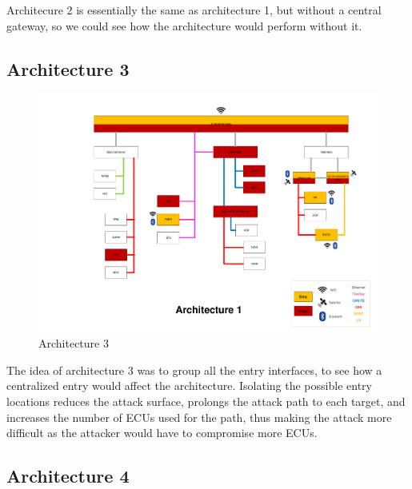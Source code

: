 Architecure 2 is essentially the same as architecture 1, but without a central gateway, 
so we could see how the architecture would perform without it.\par


\subsection{Architecture 3}
\label{subsec:arch3}

\begin{figure}[h!]
    \caption{Architecture 3}
    \includegraphics[width=\textwidth, page=3]{../Architectures-survey.pdf}
\end{figure}

The idea of architecture 3 was to group all the entry interfaces, to see how a centralized entry would affect the architecture.
Isolating the possible entry locations reduces the attack surface, prolongs the attack path to each target, and increases the number of ECUs used for the path, thus making the attack more difficult as the attacker would have to compromise more ECUs.\par


\subsection{Architecture 4}
\label{subsec:arch4}

